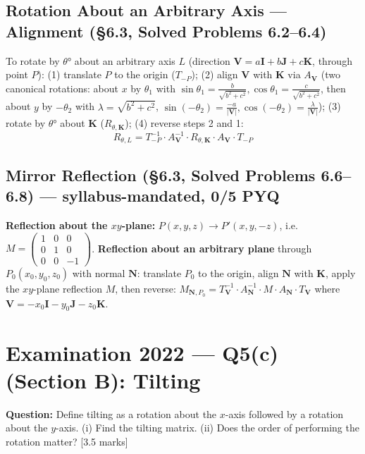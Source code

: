 \documentclass[12pt, a4paper]{article}
\newenvironment{solutionbox}{\begin{mdframed}[style=solutionframe]}{\end{mdframed}}
\newenvironment{answerbox}{\begin{mdframed}[style=answerframe]}{\end{mdframed}}
\begin{document}
\subsection{Rotation About an Arbitrary Axis --- Alignment (\S6.3, Solved Problems 6.2--6.4)}
\begin{answerbox}
To rotate by $\theta°$ about an arbitrary axis $L$ (direction $\mathbf V=a\mathbf I+b\mathbf J+c\mathbf K$, through point $P$): (1) translate $P$ to the origin ($T_{-P}$); (2) align $\mathbf V$ with $\mathbf K$ via $A_{\mathbf V}$ (two canonical rotations: about $x$ by $\theta_1$ with $\sin\theta_1=\frac{b}{\sqrt{b^2+c^2}},\cos\theta_1=\frac{c}{\sqrt{b^2+c^2}}$, then about $y$ by $-\theta_2$ with $\lambda=\sqrt{b^2+c^2}$, $\sin(-\theta_2)=\frac{-a}{|\mathbf V|},\cos(-\theta_2)=\frac{\lambda}{|\mathbf V|}$); (3) rotate by $\theta°$ about $\mathbf K$ ($R_{\theta,\mathbf K}$); (4) reverse steps 2 and 1:
$$R_{\theta,L} = T_{-P}^{-1}\cdot A_{\mathbf V}^{-1}\cdot R_{\theta,\mathbf K}\cdot A_{\mathbf V}\cdot T_{-P}$$
\end{answerbox}

\subsection{Mirror Reflection (\S6.3, Solved Problems 6.6--6.8) --- syllabus-mandated, 0/5 PYQ}
\begin{answerbox}
\textbf{Reflection about the $xy$-plane:} $P(x,y,z)\to P'(x,y,-z)$, i.e.\ $M=\begin{pmatrix}1&0&0\\0&1&0\\0&0&-1\end{pmatrix}$.
\textbf{Reflection about an arbitrary plane} through $P_0(x_0,y_0,z_0)$ with normal $\mathbf N$: translate $P_0$ to the origin, align $\mathbf N$ with $\mathbf K$, apply the $xy$-plane reflection $M$, then reverse: $M_{\mathbf N,P_0}=T_{\mathbf V}^{-1}\cdot A_{\mathbf N}^{-1}\cdot M\cdot A_{\mathbf N}\cdot T_{\mathbf V}$ where $\mathbf V=-x_0\mathbf I-y_0\mathbf J-z_0\mathbf K$.
\end{answerbox}

\section{Examination 2022 --- Q5(c) (Section B): Tilting}
\begin{solutionbox}
\textbf{Question:} Define tilting as a rotation about the $x$-axis followed by a rotation about the $y$-axis. (i) Find the tilting matrix. (ii) Does the order of performing the rotation matter? [3.5 marks]
\end{solutionbox}
\end{document}
